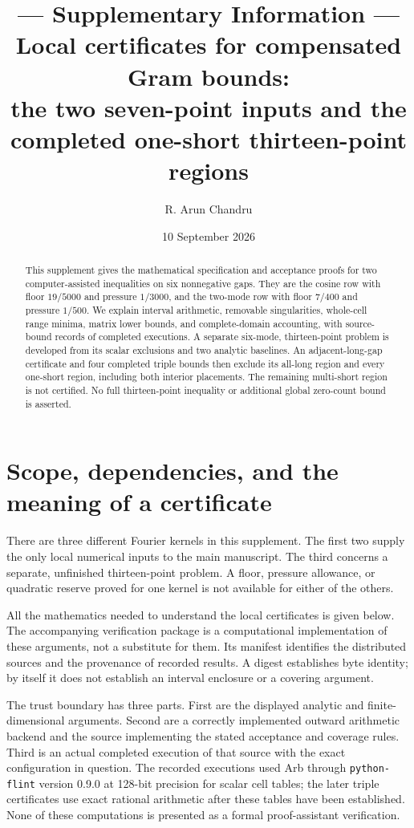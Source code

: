 \documentclass[11pt]{amsart}
\title[Local certificates and the thirteen-point boundary]{--- Supplementary Information ---\\ Local certificates for compensated Gram bounds:\\
the two seven-point inputs and the completed one-short thirteen-point regions}
\author{R. Arun Chandru}
\date{10 September 2026}
\numberwithin{equation}{section}
\begin{document}
\begin{abstract}
This supplement gives the mathematical specification
and acceptance proofs for two computer-assisted inequalities on six
nonnegative gaps. They are the cosine row with floor $19/5000$ and
pressure $1/3000$, and the two-mode row with floor $7/400$ and pressure
$1/500$. We explain interval arithmetic, removable singularities,
whole-cell range minima, matrix lower bounds, and complete-domain
accounting, with source-bound records of completed executions.
A separate six-mode, thirteen-point problem is developed from its scalar
exclusions and two analytic baselines. An adjacent-long-gap certificate
and four completed triple bounds then exclude its all-long region and
every one-short region, including both interior placements. The remaining
multi-short region is not certified. No full thirteen-point inequality
or additional global zero-count bound is asserted.
\end{abstract}
\maketitle
\tableofcontents

\section{Scope, dependencies, and the meaning of a certificate}

There are three different Fourier kernels in this supplement. The first
two supply the only local numerical inputs to the main manuscript. The
third concerns a separate, unfinished thirteen-point problem. A floor,
pressure allowance, or quadratic reserve proved for one kernel is not
available for either of the others.

All the mathematics needed to understand the local certificates is given
below. The accompanying verification package is
a computational implementation of these arguments, not a substitute for
them. Its manifest identifies the distributed sources and the provenance
of recorded results. A digest establishes byte identity; by itself it
does not establish an interval enclosure or a covering argument.

The trust boundary has three parts. First are the displayed analytic and
finite-dimensional arguments. Second are a correctly implemented outward
arithmetic backend and the source implementing the stated acceptance and
coverage rules. Third is an actual completed execution of that source
with the exact configuration in question. The recorded executions used
Arb through \texttt{python-flint} version 0.9.0 at 128-bit precision for
scalar cell tables; the later triple certificates use exact rational
arithmetic after these tables have been established. None of these
computations is presented as a formal proof-assistant verification.
\end{document}
